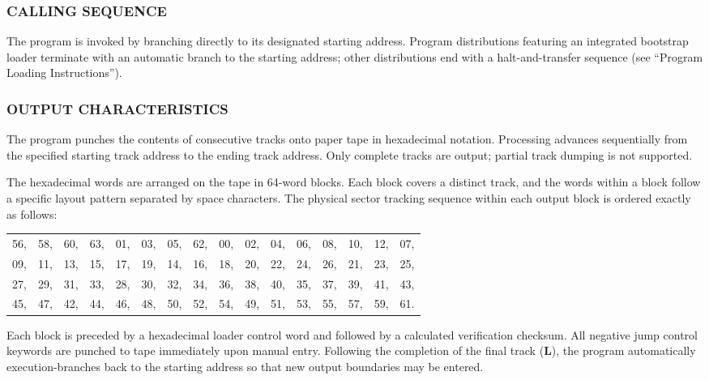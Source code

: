 \subsubsection*{CALLING SEQUENCE}
The program is invoked by branching directly to its designated starting address. Program distributions featuring an integrated bootstrap loader terminate with an automatic branch to the starting address; other distributions end with a halt-and-transfer sequence (see ``Program Loading Instructions'').

\subsubsection*{OUTPUT CHARACTERISTICS}
The program punches the contents of consecutive tracks onto paper tape in hexadecimal notation. Processing advances sequentially from the specified starting track address to the ending track address. Only complete tracks are output; partial track dumping is not supported.

The hexadecimal words are arranged on the tape in 64-word blocks. Each block covers a distinct track, and the words within a block follow a specific layout pattern separated by space characters. The physical sector tracking sequence within each output block is ordered exactly as follows:
\begin{center}
\footnotesize
\begin{tabular}{rlllllllllllllll}
    56, & 58, & 60, & 63, & 01, & 03, & 05, & 62, & 00, & 02, & 04, & 06, & 08, & 10, & 12, & 07, \\
    09, & 11, & 13, & 15, & 17, & 19, & 14, & 16, & 18, & 20, & 22, & 24, & 26, & 21, & 23, & 25, \\
    27, & 29, & 31, & 33, & 28, & 30, & 32, & 34, & 36, & 38, & 40, & 35, & 37, & 39, & 41, & 43, \\
    45, & 47, & 42, & 44, & 46, & 48, & 50, & 52, & 54, & 49, & 51, & 53, & 55, & 57, & 59, & 61.  \\
\end{tabular}
\end{center}
Each block is preceded by a hexadecimal loader control word and followed by a calculated verification checksum. All negative jump control keywords are punched to tape immediately upon manual entry. Following the completion of the final track (\textbf{L}), the program automatically execution-branches back to the starting address so that new output boundaries may be entered.

